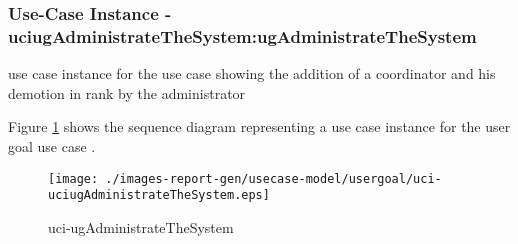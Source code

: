 
	\subsubsection{Use-Case Instance - uciugAdministrateTheSystem:ugAdministrateTheSystem}
	
	use case instance for the use case  showing the addition of a coordinator and his demotion in rank by the administrator		  
	\begin{operationmodel}
	
	\end{operationmodel} 

	
	Figure \ref{fig:lu.uni.lassy.excalibur.examples.icrash-RE-UC-uci-uciugAdministrateTheSystem}
	shows the sequence diagram representing a use case instance for the user goal use case .
	
	\begin{figure}[htbp]
	\begin{center}
	
	\texttt{[image: ./images-report-gen/usecase-model/usergoal/uci-uciugAdministrateTheSystem.eps]}
	\end{center}
	\caption[lu.uni.lassy.excalibur.examples.icrash Sequence Diagram: uci-uciugAdministrateTheSystem]{uci-ugAdministrateTheSystem}
	\label{fig:lu.uni.lassy.excalibur.examples.icrash-RE-UC-uci-uciugAdministrateTheSystem}
	\end{figure}
	\vspace{0.5cm}
